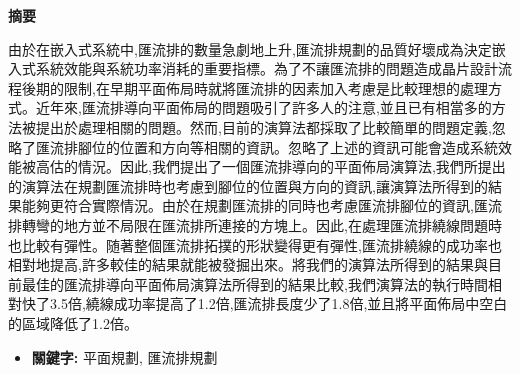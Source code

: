 



\newpage
{}



\begin{center}
\large \textbf{摘要}
\end{center}


由於在嵌入式系統中,匯流排的數量急劇地上升,匯流排規劃的品質好壞成為決定嵌入式系統效能與系統功率消耗的重要指標。為了不讓匯流排的問題造成晶片設計流程後期的限制,在早期平面佈局時就將匯流排的因素加入考慮是比較理想的處理方式。近年來,匯流排導向平面佈局的問題吸引了許多人的注意,並且已有相當多的方法被提出於處理相關的問題。然而,目前的演算法都採取了比較簡單的問題定義,忽略了匯流排腳位的位置和方向等相關的資訊。忽略了上述的資訊可能會造成系統效能被高估的情況。因此,我們提出了一個匯流排導向的平面佈局演算法,我們所提出的演算法在規劃匯流排時也考慮到腳位的位置與方向的資訊,讓演算法所得到的結果能夠更符合實際情況。由於在規劃匯流排的同時也考慮匯流排腳位的資訊,匯流排轉彎的地方並不局限在匯流排所連接的方塊上。因此,在處理匯流排繞線問題時也比較有彈性。随著整個匯流排拓撲的形狀變得更有彈性,匯流排繞線的成功率也相對地提高,許多較佳的結果就能被發掘出來。將我們的演算法所得到的結果與目前最佳的匯流排導向平面佈局演算法所得到的結果比較,我們演算法的執行時間相對快了3.5倍,繞線成功率提高了1.2倍,匯流排長度少了1.8倍,並且將平面佈局中空白的區域降低了1.2倍。


\begin{itemize}
\item {\bf 關鍵字:} 平面規劃, 匯流排規劃
\end{itemize}



